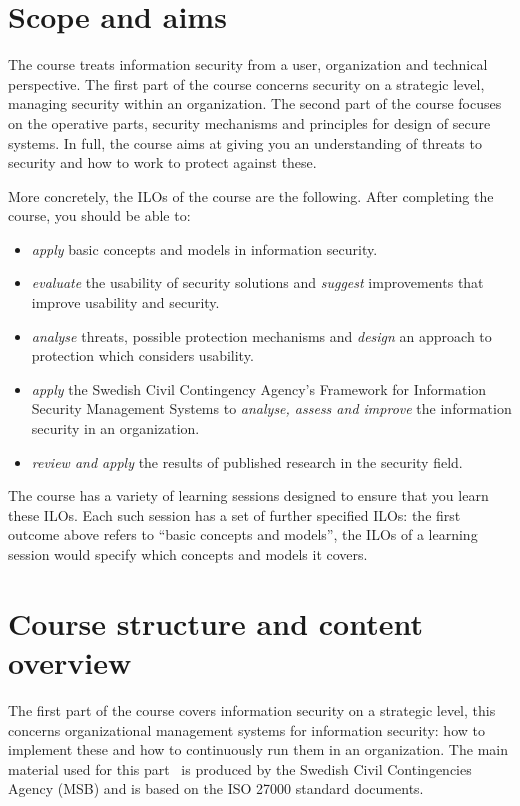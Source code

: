 \section{Scope and aims}%
\label{sec:aim}

The course treats information security from a user, organization and technical 
perspective.
The first part of the course concerns security on a strategic level, \ie 
managing security within an organization.
The second part of the course focuses on the operative parts, \ie security 
mechanisms and principles for design of secure systems.
In full, the course aims at giving you an understanding of threats to security 
and how to work to protect against these.

More concretely, the \acp{ILO} of the course are the following.
After completing the course, you should be able to:
\begin{itemize}
  \item \emph{apply} basic concepts and models in information security.
  \item \emph{evaluate} the usability of security solutions and \emph{suggest} 
    improvements that improve usability and security.
  \item \emph{analyse} threats, possible protection mechanisms and 
    \emph{design} an approach to protection which considers usability.
  \item \emph{apply} the Swedish Civil Contingency Agency's Framework for 
    Information Security Management Systems to \emph{analyse, assess and 
      improve} the information security in an organization.
  \item \emph{review and apply} the results of published research in the 
    security field.
\end{itemize}
The course has a variety of learning sessions designed to ensure that you learn 
these \acp{ILO}.
Each such session has a set of further specified \acp{ILO}:
\eg the first outcome above refers to \enquote{basic concepts and models}, 
the \acp{ILO} of a learning session would specify which concepts and models it 
covers.


\section{Course structure and content overview}%
\label{sec:outline}

The first part of the course covers information security on a strategic level, 
this concerns organizational management systems for information security: how 
to implement these and how to continuously run them in an organization.
The main material used for this part~\cite{%
  MSB2011itm,MSB2011sle,MSB2011p,%
	MSB2011v,MSB2011r,MSB2011gap,MSB2011gb,%
	MSB2011vs,MSB2011us,MSB2011upo,%
	MSB2011pg,MSB2011koa,MSB2011i,%
	MSB2011o,MSB2011g,MSB2011lg,%
	MSB2011ulo,MSB2011kf,MSB2011fa%
} is produced by the Swedish Civil Contingencies Agency (MSB) and is based on 
the ISO 27000 standard documents.

